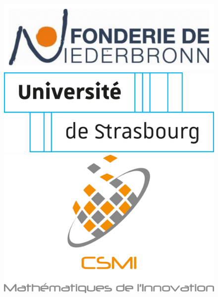 \documentclass[12pt]{article}
\begin{document}
\begin{titlepage}
    \begin{figure}[b!]
    \centering
    \vfill
    \includegraphics[scale=0.16]{Images/Presentation/logo-Fonderie.pdf}
    \hspace{0.5 cm}
    \includegraphics[scale=0.16]{Images/Presentation/logo-unistra.pdf}
    \hspace{0.5 cm}
    \includegraphics[scale=0.16]{Images/Presentation/logoCSMI.pdf}
    \end{figure}
    
 
    
    
\end{titlepage}


\newpage

\tableofcontents

\newpage
\end{document}
